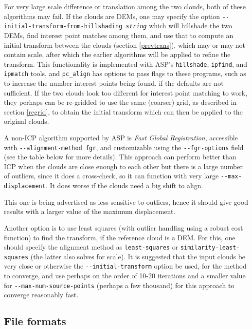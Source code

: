 For very large scale difference or translation among the two clouds,
both of these algorithms may fail. If the clouds are DEMs, one may
specify the option \texttt{-\/-initial-transform-from-hillshading
\textit{string}} which will hillshade the two DEMs, find interest point
matches among them, and use that to compute an initial transform between
the clouds (section \ref{prevtrans}), which may or may not contain
scale, after which the earlier algorithms will be applied to refine the
transform. This functionality is implemented with ASP's
\texttt{hillshade}, \texttt{ipfind}, and \texttt{ipmatch} tools, and
\texttt{pc\_align} has options to pass flags to these programs, such as
to increase the number interest points being found, if the defaults are
not sufficient. If the two clouds look too different for interest point
matching to work, they perhaps can be re-gridded to use the same
(coarser) grid, as described in section \ref{regrid}, to obtain the
initial transform which can then be applied to the original clouds.
 
A non-ICP algorithm supported by ASP is \textit{Fast Global Registration},
accessible with \texttt{-\/-alignment-method fgr}, and customizable
using the \texttt{-\/-fgr-options} field (see the table below for more details).
This approach can perform better than ICP when the clouds are close enough to each
other but there is a large number of outliers, since it does a cross-check, so it can
function with very large \texttt{-\/-max-displacement}. It does worse if the
clouds need a big shift to align.

This one is being advertised as less sensitive to outliers, hence
it should give good results with a larger value of the maximum displacement.  

Another option is to use least squares (with outlier handling using a
robust cost function) to find the transform, if the reference cloud is a
DEM. For this, one should specify the alignment method as
\texttt{least-squares} or \texttt{similarity-least-squares} (the latter
also solves for scale). It is
suggested that the input clouds be very close or otherwise the
\texttt{-\/-initial-transform} option be used, for the method to
converge, and use perhaps on the order of 10-20
iterations and a smaller value for \texttt{-\/-max-num-source-points}
(perhaps a few thousand) for this approach to converge reasonably fast.

\subsection{File formats}

